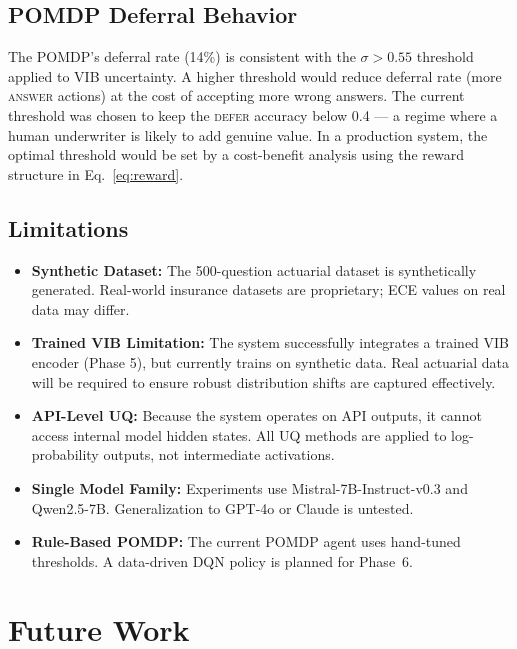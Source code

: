 \documentclass[conference]{IEEEtran}
\begin{document}
\subsection{POMDP Deferral Behavior}

The POMDP's deferral rate (14\%) is consistent with the
$\sigma > 0.55$ threshold applied to VIB uncertainty. A higher
threshold would reduce deferral rate (more \textsc{answer} actions)
at the cost of accepting more wrong answers. The current threshold
was chosen to keep the \textsc{defer} accuracy below 0.4 --- a
regime where a human underwriter is likely to add genuine value.
In a production system, the optimal threshold would be set by a
cost-benefit analysis using the reward structure in Eq.~\ref{eq:reward}.

\subsection{Limitations}

\begin{itemize}[leftmargin=*]
    \item \textbf{Synthetic Dataset:} The 500-question actuarial
          dataset is synthetically generated. Real-world insurance
          datasets are proprietary; ECE values on real data may differ.
    \item \textbf{Trained VIB Limitation:} The system successfully integrates a trained VIB encoder (Phase 5), but currently trains on synthetic data. Real actuarial data will be required to ensure robust distribution shifts are captured effectively.
    \item \textbf{API-Level UQ:} Because the system operates on API
          outputs, it cannot access internal model hidden states. All
          UQ methods are applied to log-probability outputs, not
          intermediate activations.
    \item \textbf{Single Model Family:} Experiments use
          Mistral-7B-Instruct-v0.3 and Qwen2.5-7B. Generalization
          to GPT-4o or Claude is untested.
    \item \textbf{Rule-Based POMDP:} The current POMDP agent uses
          hand-tuned thresholds. A data-driven DQN policy is planned
          for Phase~6.
\end{itemize}

\section{Future Work}
\label{sec:future}
\end{document}

